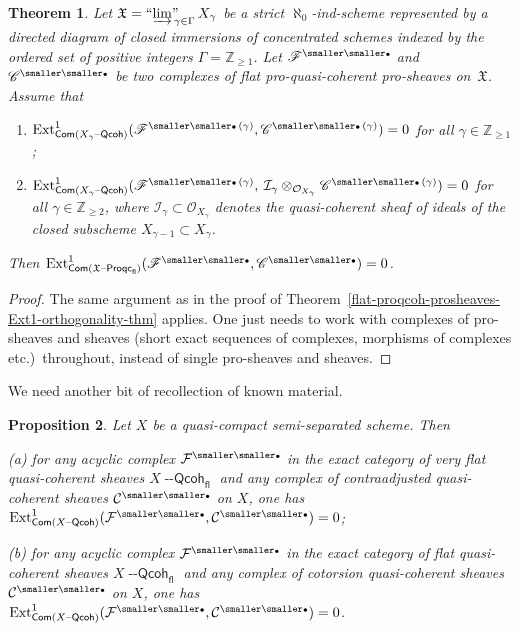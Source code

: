\documentclass[12pt,a4paper]{amsart}
\newcommand{\+}{\protect\nobreakdash-}
\renewcommand{\:}{\colon}
\newcommand{\ot}{\otimes}
\newcommand{\bu}{{\text{\smaller\smaller$\scriptstyle\bullet$}}}
\DeclareMathOperator{\Ext}{Ext}
\newcommand{\Qcoh}{{\operatorname{\mathsf{--Qcoh}}}}
\newcommand{\Proqc}{{\operatorname{\mathsf{--Proqc}}}}
\newcommand{\fl}{\mathsf{fl}}
\newcommand{\Com}{\mathsf{Com}}
\newcommand{\ilim}
 {\mathop{\text{\normalfont``$\varinjlim$''\!\!}}\nolimits}
\newcommand{\cO}{\mathcal O}
\newcommand{\cI}{\mathcal I}
\newcommand{\cF}{\mathcal F}
\newcommand{\cC}{\mathcal C}
\newcommand{\fX}{\mathfrak X}
\newcommand{\rC}{\mathscr C}
\newcommand{\rF}{\mathscr F}
\newcommand{\boZ}{\mathbb Z}
\theoremstyle{plain}
\newtheorem{thm}{Theorem}[section]
\newtheorem{prop}[thm]{Proposition}
\theoremstyle{definition}
\begin{document}
\begin{thm} \label{cmplxes-offlat-proqcoh-prosh-Ext1-orthogty-thm}
 Let\/ $\fX=\ilim_{\gamma\in\Gamma}X_\gamma$ be a strict\/
$\aleph_0$\+ind-scheme represented by a directed diagram of closed
immersions of concentrated schemes indexed by the ordered set of
positive integers\/ $\Gamma=\boZ_{\ge1}$.
 Let\/ $\rF^\bu$ and\/ $\rC^\bu$ be two complexes of flat
pro-quasi-coherent pro-sheaves on\/~$\fX$.
 Assume that
\begin{enumerate}
\renewcommand{\theenumi}{\roman{enumi}}
\item $\Ext^1_{\Com(X_\gamma\Qcoh)}
(\rF^{\bu\,(\gamma)},\rC^{\bu\,(\gamma)})=0$
for all\/ $\gamma\in\boZ_{\ge1}$;
\item $\Ext^1_{\Com(X_\gamma\Qcoh)}(\rF^{\bu\,(\gamma)},\>
\cI_\gamma\ot_{\cO_{X_\gamma}}\rC^{\bu\,(\gamma)})=0$
for all\/ $\gamma\in\boZ_{\ge2}$, where\/
$\cI_{\gamma}\subset\cO_{X_\gamma}$ denotes the quasi-coherent sheaf
of ideals of the closed subscheme $X_{\gamma-1}\subset X_\gamma$.
\end{enumerate}
 Then\/ $\Ext^1_{\Com(\fX\Proqc_\fl)}(\rF^\bu,\rC^\bu)=0$.
\end{thm}

\begin{proof}
 The same argument as in the proof of
Theorem~\ref{flat-proqcoh-prosheaves-Ext1-orthogonality-thm} applies.
 One just needs to work with complexes of pro-sheaves and sheaves
(short exact sequences of complexes, morphisms of complexes etc.)\
throughout, instead of single pro-sheaves and sheaves.
\end{proof}

 We need another bit of recollection of known material.

\begin{prop} \label{termwise-cta-cot-orthogty-for-qcoh-sheaves-prop}
 Let $X$ be a quasi-compact semi-separated scheme.
 Then \par
\textup{(a)} for any acyclic complex\/ $\cF^\bu$ in the exact category
of very flat quasi-coherent sheaves $X\Qcoh_\fl$ and any complex of
contraadjusted quasi-coherent sheaves\/ $\cC^\bu$ on $X$, one has\/
$\Ext^1_{\Com(X\Qcoh)}(\cF^\bu,\cC^\bu)=0$; \par
\textup{(b)} for any acyclic complex\/ $\cF^\bu$ in the exact category
of flat quasi-coherent sheaves $X\Qcoh_\fl$ and any complex of
cotorsion quasi-coherent sheaves\/ $\cC^\bu$ on $X$, one has\/
$\Ext^1_{\Com(X\Qcoh)}(\cF^\bu,\cC^\bu)=0$.
\end{prop}
\end{document}
